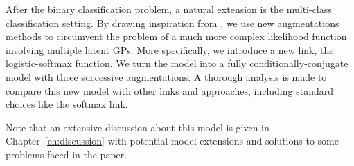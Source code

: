 



\graphicspath{{4/figures/}}

After the binary classification problem, a natural extension is the multi-class classification setting.
By drawing inspiration from \citet{donner2018efficientdensity}, we use new augmentations methods to circumvent the problem of a much more complex likelihood function involving multiple latent \ac{GPs}.
More specifically, we introduce a new link, the logistic-softmax function.
We turn the model into a fully conditionally-conjugate model with three successive augmentations.
A thorough analysis is made to compare this new model with other links and approaches, including standard choices like the softmax link.  

Note that an extensive discussion about this model is given in Chapter~\ref{ch:discussion} with potential model extensions and solutions to some problems faced in the paper.

